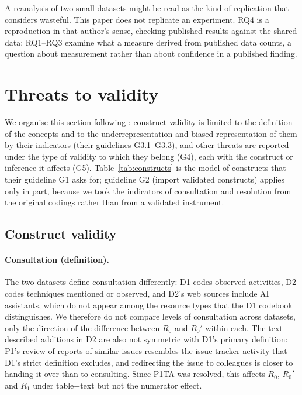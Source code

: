 \documentclass[pdflatex,sn-basic]{sn-jnl}
\newcommand{\Rz}{\ensuremath{R_0}}
\newcommand{\Rzp}{\ensuremath{R_0'}}
\newcommand{\Ro}{\ensuremath{R_1}}
\begin{document}
A reanalysis of two small datasets might be read as the kind of replication that \citet{shepperd2018replication} considers wasteful. This paper does not replicate an experiment. RQ4 is a reproduction in that author's sense, checking published results against the shared data; RQ1--RQ3 examine what a measure derived from published data counts, a question about measurement rather than about confidence in a published finding.

\section{Threats to validity}\label{sec:threats}

We organise this section following \citet{sjoberg2023}: construct validity is limited to the definition of the concepts and to the underrepresentation and biased representation of them by their indicators (their guidelines G3.1--G3.3), and other threats are reported under the type of validity to which they belong (G4), each with the construct or inference it affects (G5). Table~\ref{tab:constructs} is the model of constructs that their guideline G1 asks for; guideline G2 (import validated constructs) applies only in part, because we took the indicators of consultation and resolution from the original codings rather than from a validated instrument.

\subsection{Construct validity}

\paragraph{Consultation (definition).} The two datasets define consultation differently: D1 codes observed activities, D2 codes techniques mentioned or observed, and D2's web sources include AI assistants, which do not appear among the resource types that the D1 codebook distinguishes. We therefore do not compare levels of consultation across datasets, only the direction of the difference between \Rz{} and \Rzp{} within each. The text-described additions in D2 are also not symmetric with D1's primary definition: P1's review of reports of similar issues resembles the issue-tracker activity that D1's strict definition excludes, and redirecting the issue to colleagues is closer to handing it over than to consulting. Since P1TA was resolved, this affects \Rz{}, \Rzp{} and \Ro{} under table+text but not the numerator effect.
\end{document}
